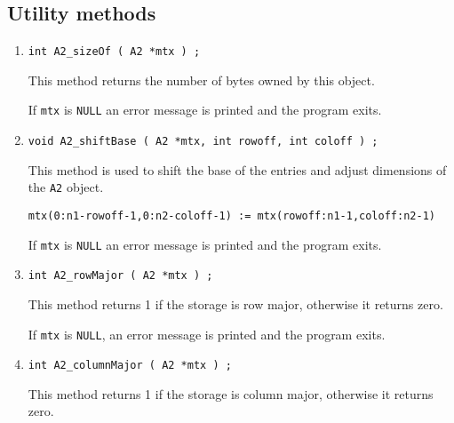 \subsection{Utility methods}
\label{subsection:A2:proto:utilities}
\par
\begin{enumerate}
\item
\begin{verbatim}
int A2_sizeOf ( A2 *mtx ) ;
\end{verbatim}
This method returns the number of bytes owned by this object.
\par {}
If {\tt mtx} is {\tt NULL}
an error message is printed and the program exits.
\item
\begin{verbatim}
void A2_shiftBase ( A2 *mtx, int rowoff, int coloff ) ;
\end{verbatim}
This method is used to shift the base of the entries and adjust
dimensions of the  {\tt A2} object.
\begin{verbatim}
mtx(0:n1-rowoff-1,0:n2-coloff-1) := mtx(rowoff:n1-1,coloff:n2-1) 
\end{verbatim}
\par {}
If {\tt mtx} is {\tt NULL}
an error message is printed and the program exits.
\item
\begin{verbatim}
int A2_rowMajor ( A2 *mtx ) ;
\end{verbatim}
This method returns 1 if the storage is row major, 
otherwise it returns zero.
\par {}
If {\tt mtx} is {\tt NULL},
an error message is printed and the program exits.
\item
\begin{verbatim}
int A2_columnMajor ( A2 *mtx ) ;
\end{verbatim}
This method returns 1 if the storage is column major, 
otherwise it returns zero.

\end{enumerate}
